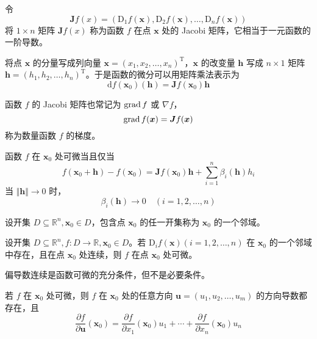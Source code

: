 \begin{definition}
    令
    \[
        \bm{J}f(x) = (\mathrm{D}_{1}f(\bm{x}), \mathrm{D}_{2}f(\bm{x}), \ldots, \mathrm{D}_{n}f(\bm{x}))
    \]
    将 $1 \times n$ 矩阵 $\bm{J}f(x)$ 称为函数 $f$ 在点 $\bm{x}$ 处的 Jacobi 矩阵，它相当于一元函数的一阶导数。
\end{definition}

\begin{remark}
    将点 $\bm{x}$ 的分量写成列向量 $\bm{x} = (x_1, x_2, \ldots, x_n)^{\mathrm{T}}$，$\bm{x}$ 的改变量 $\bm{h}$ 写成 $n \times 1$ 矩阵 $\bm{h} = (h_1, h_2, \ldots, h_n)^{\mathrm{T}}$。于是函数的微分可以用矩阵乘法表示为
    \[
        \mathrm{d}f(\bm{x}_0)(\bm{h}) = \bm{J}f(\bm{x}_0)\bm{h}
    \]
\end{remark}

\begin{remark}
    函数 $f$ 的 Jacobi 矩阵也常记为 $\operatorname{grad} f$ 或 $\nabla f$，
    \[
        \operatorname{grad} f(\bm{x}) = \bm{J}f(\bm{x})
    \]
    称为数量函数 $f$ 的梯度。
\end{remark}

\begin{theorem}
    函数 $f$ 在 $\bm{x}_0$ 处可微当且仅当
    \[
        f(\bm{x}_0 + \bm{h}) - f(\bm{x}_0) = \bm{J}f(\bm{x}_0)\bm{h} + \sum_{i = 1}^{n}\beta_{i}(\bm{h})h_{i}
    \]
    当 $\Vert \bm{h} \Vert \to 0$ 时，
    \[
        \beta_{i}(\bm{h}) \to 0 \quad (i = 1, 2, \ldots, n)
    \]
\end{theorem}

\begin{definition}
    设开集 $D \subseteq \mathbb{R}^n, \bm{x}_0 \in D$，包含点 $\bm{x}_0$ 的任一开集称为 $\bm{x}_0$ 的一个邻域。
\end{definition}

\begin{theorem}
    设开集 $D \subseteq \mathbb{R}^n, f: D \to \mathbb{R}, \bm{x}_0 \in D$。若 $\mathrm{D}_{i}f(\bm{x})(i = 1, 2, \ldots, n)$ 在 $\bm{x}_0$ 的一个邻域中存在，且在点 $\bm{x}_0$ 处连续，则 $f$ 在点 $\bm{x}_0$ 处可微。
\end{theorem}

\begin{remark}
    偏导数连续是函数可微的充分条件，但不是必要条件。
\end{remark}

\begin{theorem}
    若 $f$ 在 $\bm{x}_0$ 处可微，则 $f$ 在 $\bm{x}_0$ 处的任意方向 $\bm{u} = (u_1, u_2, \ldots, u_m)$ 的方向导数都存在，且
    \[
        \frac{\partial f}{\partial \bm{u}}(\bm{x}_0) = \frac{\partial f}{\partial x_1}(\bm{x}_0)u_{1} + \cdots + \frac{\partial f}{\partial x_n}(\bm{x}_0)u_{n}
    \]
\end{theorem}

